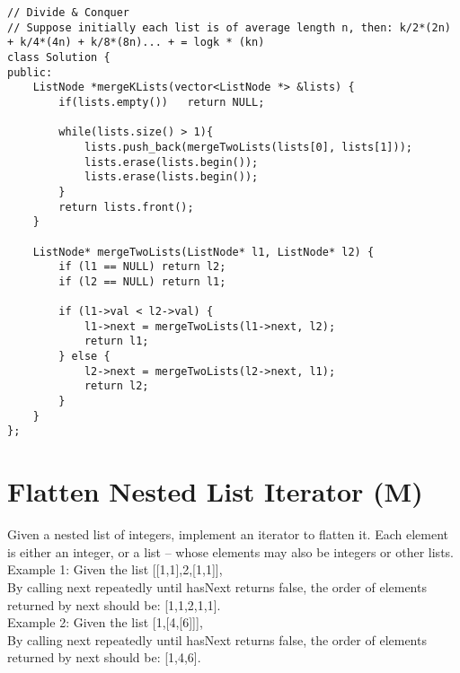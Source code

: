 \begin{lstlisting}
// Divide & Conquer
// Suppose initially each list is of average length n, then: k/2*(2n) + k/4*(4n) + k/8*(8n)... + = logk * (kn)
class Solution {
public:
    ListNode *mergeKLists(vector<ListNode *> &lists) {
        if(lists.empty())   return NULL;
        
        while(lists.size() > 1){
            lists.push_back(mergeTwoLists(lists[0], lists[1]));
            lists.erase(lists.begin());
            lists.erase(lists.begin());
        }
        return lists.front();
    }
    
    ListNode* mergeTwoLists(ListNode* l1, ListNode* l2) {
        if (l1 == NULL) return l2;
        if (l2 == NULL) return l1;
        
        if (l1->val < l2->val) {
            l1->next = mergeTwoLists(l1->next, l2);
            return l1;
        } else {
            l2->next = mergeTwoLists(l2->next, l1);
            return l2;
        }
    }
};
\end{lstlisting}


\section{Flatten Nested List Iterator (M)}
Given a nested list of integers, implement an iterator to flatten it. Each element is either an integer, or a list -- whose elements may also be integers or other lists.\\

Example 1: Given the list [[1,1],2,[1,1]],\\
By calling next repeatedly until hasNext returns false, the order of elements returned by next should be: [1,1,2,1,1].\\

Example 2: Given the list [1,[4,[6]]],\\
By calling next repeatedly until hasNext returns false, the order of elements returned by next should be: [1,4,6]. \\
 
